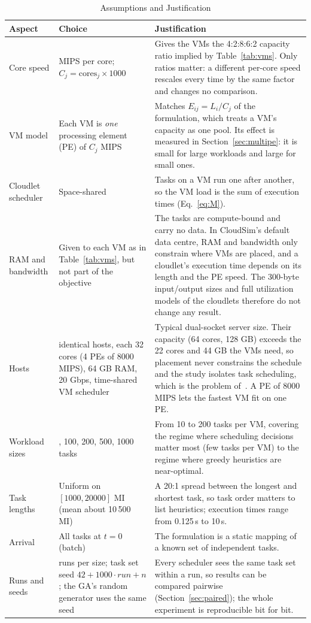 \documentclass[journal,onecolumn,12pt]{IEEEtran}
\begin{document}
\begin{table}[!htbp]
\caption{Assumptions and Justification}
\label{tab:assumptions}
\centering
\small
\begin{tabularx}{\textwidth}{@{}>{\raggedright\arraybackslash}p{3.1cm}>{\raggedright\arraybackslash}p{4.2cm}>{\raggedright\arraybackslash}X@{}}
\toprule
Aspect & Choice & Justification \\
\midrule
Core speed & 1000 MIPS per core; $C_j=\text{cores}_j\times1000$ & Gives the VMs the 4:2:8:6:2 capacity ratio implied by Table~\ref{tab:vms}. Only ratios matter: a different per-core speed rescales every time by the same factor and changes no comparison. \\
VM model & Each VM is \emph{one} processing element (PE) of $C_j$ MIPS & Matches $E_{ij}=L_i/C_j$ of the formulation, which treats a VM's capacity as one pool. Its effect is measured in Section~\ref{sec:multipe}: it is small for large workloads and large for small ones. \\
Cloudlet scheduler & Space-shared & Tasks on a VM run one after another, so the VM load is the sum of execution times (Eq.~\ref{eq:M}). \\
RAM and bandwidth & Given to each VM as in Table~\ref{tab:vms}, but not part of the objective & The tasks are compute-bound and carry no data. In CloudSim's default data centre, RAM and bandwidth only constrain where VMs are placed, and a cloudlet's execution time depends on its length and the PE speed. The 300-byte input/output sizes and full utilization models of the cloudlets therefore do not change any result. \\
Hosts & 2 identical hosts, each 32 cores (4 PEs of 8000 MIPS), 64 GB RAM, 20 Gbps, time-shared VM scheduler & Typical dual-socket server size. Their capacity (64 cores, 128 GB) exceeds the 22 cores and 44 GB the VMs need, so placement never constrains the schedule and the study isolates task scheduling, which is the problem of~\cite{dehury}. A PE of 8000 MIPS lets the fastest VM fit on one PE. \\
Workload sizes & 50, 100, 200, 500, 1000 tasks & From 10 to 200 tasks per VM, covering the regime where scheduling decisions matter most (few tasks per VM) to the regime where greedy heuristics are near-optimal. \\
Task lengths & Uniform on $[1000, 20000]$ MI (mean about 10\,500 MI) & A 20:1 spread between the longest and shortest task, so task order matters to list heuristics; execution times range from 0.125\,s to 10\,s. \\
Arrival & All tasks at $t=0$ (batch) & The formulation is a static mapping of a known set of independent tasks. \\
Runs and seeds & 10 runs per size; task set seed $42+1000\cdot\mathit{run}+n$; the GA's random generator uses the same seed & Every scheduler sees the same task set within a run, so results can be compared pairwise (Section~\ref{sec:paired}); the whole experiment is reproducible bit for bit. \\
\bottomrule
\end{tabularx}
\end{table}
\end{document}
